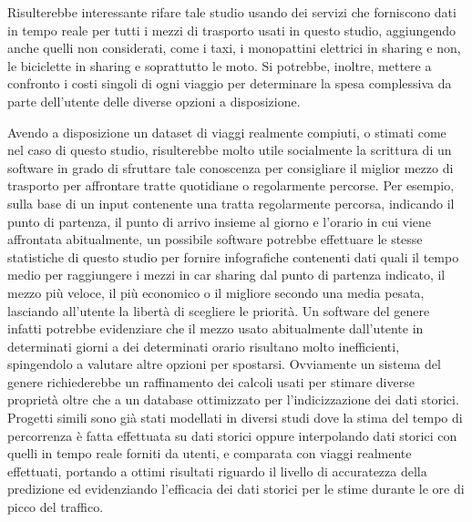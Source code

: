 Risulterebbe interessante rifare tale studio usando dei servizi che forniscono dati in tempo reale per tutti i mezzi di trasporto usati in questo studio, aggiungendo anche quelli non considerati, come i taxi, i monopattini elettrici in sharing e non, le biciclette in sharing e soprattutto le moto. Si potrebbe, inoltre, mettere a confronto i costi singoli di ogni viaggio per determinare la spesa complessiva da parte dell'utente delle diverse opzioni a disposizione.

Avendo a disposizione un dataset di viaggi realmente compiuti, o stimati come nel caso di questo studio, risulterebbe molto utile socialmente la scrittura di un software in grado di sfruttare tale conoscenza per consigliare il miglior mezzo di trasporto per affrontare tratte quotidiane o regolarmente percorse. Per esempio, sulla base di un input contenente una tratta regolarmente percorsa, indicando il punto di partenza, il punto di arrivo insieme al giorno e l'orario in cui viene affrontata abitualmente, un possibile software potrebbe effettuare le stesse statistiche di questo studio per fornire infografiche contenenti dati quali il tempo medio per raggiungere i mezzi in car sharing dal punto di partenza indicato, il mezzo più veloce, il più economico o il migliore secondo una media pesata, lasciando all'utente la libertà di scegliere le priorità. Un software del genere infatti potrebbe evidenziare che il mezzo usato abitualmente dall'utente in determinati giorni a dei determinati orario risultano molto inefficienti, spingendolo a valutare altre opzioni per spostarsi. Ovviamente un sistema del genere richiederebbe un raffinamento dei calcoli usati per stimare diverse proprietà oltre che a un database ottimizzato per l'indicizzazione dei dati storici. Progetti simili sono già stati modellati in diversi studi dove la stima del tempo di percorrenza è fatta effettuata su dati storici oppure interpolando dati storici con quelli in tempo reale forniti da utenti, e comparata con viaggi realmente effettuati, portando a ottimi risultati riguardo il livello di accuratezza della predizione ed evidenziando l'efficacia dei dati storici per le stime durante le ore di picco del traffico\cite{deeshma2014}\cite{chien2003}.
















